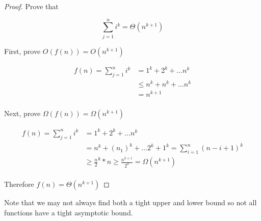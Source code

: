 \documentclass[../notes.tex]{subfiles}
\begin{document}
\begin{proof}
	Prove that 

	\begin{equation}
		\sum^n_{j=1} i^k = \Theta(n^{k+1})
	\end{equation}

	First, prove $ O(f(n)) = O(n^{k+1}) $ 

	\begin{equation}
		\begin{split}
			f(n) = \sum^n_{j=1} i^k &= 1^k + 2^k + \ldots n^k \\
			 &\le n^k + n^k + \ldots n^k  \\
			 &= n^{k+1} \\
		\end{split}
	\end{equation}


	Next, prove $ \Omega(f(n)) = \Omega(n^{k+1}) $ 

	\begin{equation}
		\begin{split}
			f(n) = \sum^n_{j=1} i^k &= 1^k + 2^k + \ldots n^k \\
			 &= n^k + (n_1)^k + \ldots 2^k + 1^k = \sum^n_{i=1} (n-i+1)^k \\
			 &\ge   \frac{n}{2}^k * n \ge \frac{n^{k+1}}{2^k} = \Omega(n^{k+1}) \\
		\end{split}
	\end{equation}

	Therefore $ f(n) = \Theta(n^{k+1}) $ 
\end{proof}

Note that we may not always find both a tight upper and lower bound so not all functions have a tight asymptotic bound.
\end{document}
